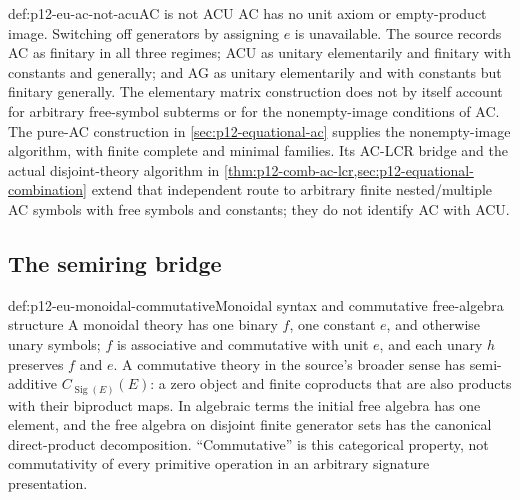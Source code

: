 \begin{proofboundary}{def:p12-eu-ac-not-acu}{AC is not ACU}
AC has no unit axiom or empty-product image. Switching off generators
by assigning \(e\) is unavailable. The source records AC as finitary
in all three regimes; ACU as unitary elementarily and finitary with
constants and generally; and AG as unitary elementarily and with
constants but finitary generally. The elementary matrix construction
does not by itself account for arbitrary free-symbol subterms or for
the nonempty-image conditions of AC. The pure-AC construction in
\cref{sec:p12-equational-ac} supplies the nonempty-image algorithm,
with finite complete and minimal families. Its AC-LCR bridge and
the actual disjoint-theory algorithm in
\cref{thm:p12-comb-ac-lcr,sec:p12-equational-combination} extend
that independent route to arbitrary finite nested/multiple AC symbols
with free symbols and constants; they do not identify AC with ACU.
\cite[\S3.4, pp.~484--486]{BaaderSnyder2001}
\end{proofboundary}



\subsection{The semiring bridge}

\begin{hbdefinition}{def:p12-eu-monoidal-commutative}{Monoidal syntax and commutative free-algebra structure}
A monoidal theory has one binary \(f\), one constant \(e\), and
otherwise unary symbols; \(f\) is associative and commutative with
unit \(e\), and each unary \(h\) preserves \(f\) and \(e\).
A commutative theory in the source's broader sense has semi-additive
\(C_{\operatorname{Sig}(E)}(E)\): a zero object and finite coproducts
that are also products with their biproduct maps. In algebraic terms the
initial free algebra has one element, and the free algebra on disjoint
finite generator sets has the canonical direct-product decomposition.
``Commutative'' is this categorical property, not commutativity of every
primitive operation in an arbitrary signature presentation.
\cite[Definitions 5.1--5.2, pp.~508--509]{BaaderSnyder2001}
\end{hbdefinition}

